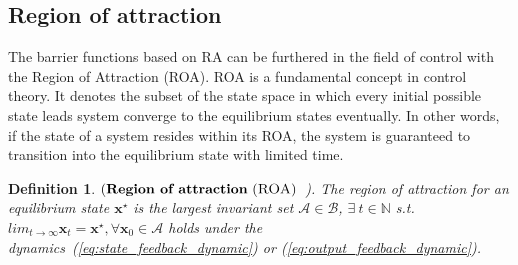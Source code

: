\documentclass[conference]{IEEEtran}
\newtheorem{definition}{\bf Definition}
\newcommand{\roa}{\textsc{ROA}\xspace}
\newcommand{\ra}{\textsc{RA}\xspace}
\newcommand{\myvec}[1]{\boldsymbol{#1}}
\newcommand{\calA}{\mathcal{A}}
\newcommand{\calB}{\mathcal{B}}
\newcommand{\calS}{\mathcal{S}}
\newcommand{\bbR}{\mathbb{R}}
\newcommand{\bbN}{\mathbb{N}}
\begin{document}
\subsection{Region of attraction}
The barrier functions based on \ra can be 
furthered in the field of control with 
the Region of Attraction (\roa). 
\roa is a fundamental concept 
in control theory. It denotes the subset of the 
state space in which every initial possible state leads 
system converge to the 
equilibrium states eventually. 
In other words, if the state of a system 
resides within its \roa, the system is guaranteed 
to transition into the equilibrium 
state with limited time. 

\begin{definition}$(\textbf{Region of attraction}\ (\roa)$~\cite{yanglyapunov}). 
The region of attraction for an equilibrium state $\myvec{x}^{\star}$ 
is the largest invariant set $\calA \in \calB$, $\exists \ t \in \bbN$ s.t. 
$lim_{t\to \infty}\myvec{x}_{t} = \myvec{x}^{\star}, 
\forall \myvec{x}_{0}\in \calA$ 
holds under the dynamics~(\ref{eq:state_feedback_dynamic}) or 
(\ref{eq:output_feedback_dynamic}). 
\end{definition}

\end{document}
